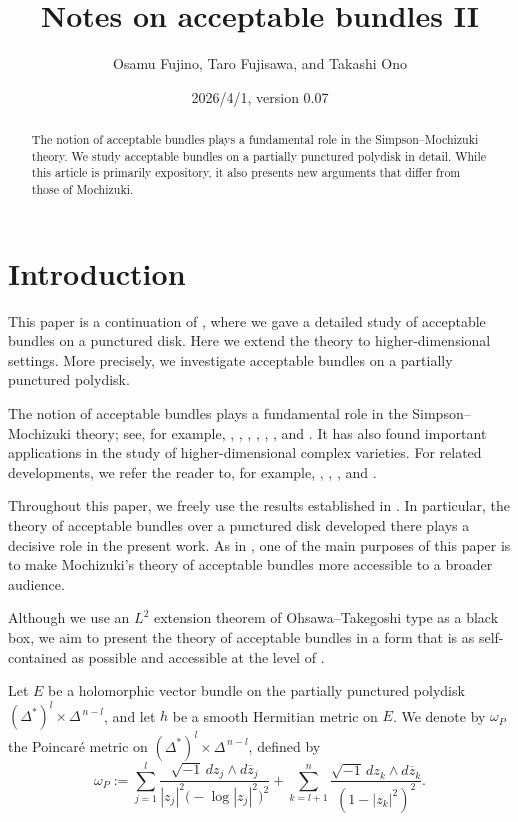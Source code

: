 \documentclass[12pt,twoside]{amsart}
\title{Notes on acceptable bundles II}
\author{Osamu Fujino, Taro Fujisawa, and Takashi Ono}
\date{2026/4/1, version 0.07}
\theoremstyle{definition}
\begin{document}
\begin{abstract} 
The notion of acceptable bundles plays a fundamental role in the
Simpson--Mochizuki theory. We study acceptable bundles on a partially punctured polydisk in detail. While this article is primarily expository, it also presents new arguments that differ from those of Mochizuki. 
\end{abstract}

\maketitle 

\tableofcontents 

\section{Introduction}\label{x-sec1}

This paper is a continuation of \cite{fujino-fujisawa-ono}, where we
gave a detailed study of acceptable bundles on a punctured disk.
Here we extend the theory to higher-dimensional settings.
More precisely, we investigate acceptable bundles on a partially
punctured polydisk.

The notion of acceptable bundles plays a fundamental role in the
Simpson--Mochizuki theory; see, for example, 
\cite{simpson1}, \cite{simpson2}, \cite{mochizuki1}, 
\cite{mochizuki2}, \cite{mochizuki3}, \cite{mochizuki4}, 
and \cite{mochizuki5}.
It has also found important applications in the study of
higher-dimensional complex varieties.
For related developments, we refer the reader to, for example,
\cite{deng}, \cite{deng-cadorel}, \cite{deng-hao}, and \cite{kim}.

Throughout this paper, we freely use the results established in
\cite{fujino-fujisawa-ono}.
In particular, the theory of acceptable bundles over a punctured disk
developed there plays a decisive role in the present work.
As in \cite{fujino-fujisawa-ono}, one of the main purposes of this paper
is to make Mochizuki's theory of acceptable bundles
\cite[Chapter~21, Acceptable Bundles]{mochizuki4} more accessible to a
broader audience.

Although we use an $L^2$ extension theorem of Ohsawa--Takegoshi type as
a black box, we aim to present the theory of acceptable bundles in a
form that is as self-contained as possible and accessible at the level
of \cite{demailly1}.

\medskip

Let $E$ be a holomorphic vector bundle on the partially punctured
polydisk $(\Delta^{*})^{l} \times \Delta^{\,n-l}$, and let $h$ be a smooth
Hermitian metric on $E$.
We denote by $\omega_{P}$ the Poincar\'e metric on
$(\Delta^{*})^{l} \times \Delta^{\,n-l}$, defined by
\[
  \omega_{P}
  := \sum_{j=1}^{l}
       \frac{\sqrt{-1}\, dz_{j} \wedge d\overline{z}_{j}}
            {|z_{j}|^{2}\bigl(-\log |z_{j}|^{2}\bigr)^{2}}
     + \sum_{k=l+1}^{n}
       \frac{\sqrt{-1}\, dz_{k} \wedge d\overline{z}_{k}}
            {(1 - |z_{k}|^{2})^{2}} .
\]
\end{document}
